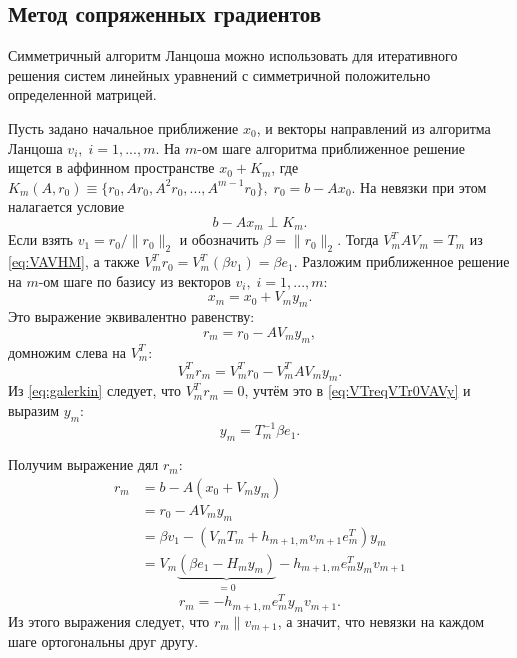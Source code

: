 \subsection{Метод сопряженных градиентов}
Симметричный алгоритм Ланцоша можно использовать для итеративного решения систем
линейных уравнений с симметричной положительно определенной матрицей.
\par Пусть задано начальное приближение $x_0$, и векторы направлений из алгоритма
Ланцоша $v_i,\;i=1,...,m$.
На $m$-ом шаге алгоритма приближенное решение ищется в аффинном пространстве $x_0 + K_m$, 
где $K_m\left(A,r_0\right) \equiv \{r_0,Ar_0,A^2r_0,...,A^{m-1}r_0\}, \; r_0 = b - Ax_0$.
На невязки при этом налагается условие 
\begin{equation}
    \label{eq:galerkin}
    b-Ax_m \perp K_m.
\end{equation}
Если взять $v_1 = r_0/\|r_0\|_2$ и 
обозначить $\beta = \|r_0\|_2$. Тогда $V_m^TAV_m = T_m$ из \eqref{eq:VAVHM}, а также $V_m^Tr_0 = V_m^T(\beta v_1)=\beta e_1$.
Разложим приближенное решение на $m$-ом шаге по базису из векторов $v_i,\;i=1,...,m$:
\begin{equation}
    x_m = x_0 + V_m y_m.
\end{equation} 
Это выражение эквивалентно равенству:
 \begin{equation}
    r_m = r_0 - AV_m y_m, 
 \end{equation}
домножим слева на $V_m^T$:
\begin{equation}
    \label{eq:VTreqVTr0VAVy}
    V_m^T r_m = V_m^T r_0 - V_m^T AV_m y_m.
\end{equation}
Из \eqref{eq:galerkin} следует, что $ V_m^T r_m = 0 $, учтём это в \eqref{eq:VTreqVTr0VAVy} 
и выразим $y_m$:
\begin{equation}
    y_m = T_m^{-1} \beta e_1.
\end{equation}

\par Получим выражение дял $r_m$:
\begin{align*}
    r_m &= b - A(x_0 + V_m y_m) \\
        &= r_0 - AV_m y_m \\
        &= \beta v_1 - (V_m T_m + h_{m+1,m}v_{m+1}e_m^T)y_m \\
        &= V_m \underbrace{(\beta e_1 - H_m y_m)}_{=0} - h_{m+1,m} e_m^T y_m v_{m+1}
\end{align*}
\begin{equation}
    \label{eq:r_m_SL}
    r_m = - h_{m+1,m} e_m^T y_m v_{m+1}.
\end{equation}
Из этого выражения следует, что $r_m \parallel v_{m+1}$, а значит, что невязки на каждом шаге ортогональны друг другу.

